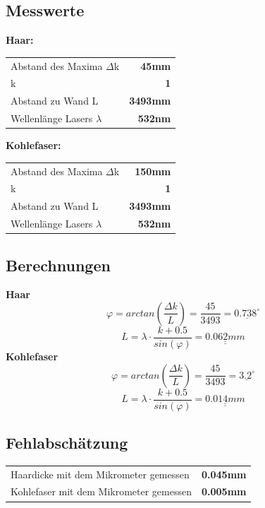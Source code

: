 \documentclass{article}
\begin{document}
\subsection{Messwerte}

\textbf{Haar:}

\begin{tabular}{l r}
	Abstand des Maxima $\Delta$k & \textbf{45mm}\\
	k	&\textbf{1}\\
	Abstand zu Wand L&\textbf{3493mm} \\
	Wellenlänge Lasers $\lambda$ & \textbf{532nm}
\end{tabular}

\textbf{Kohlefaser:}

\begin{tabular}{l r}
	Abstand des Maxima $\Delta$k & \textbf{150mm}\\
	k	&\textbf{1}\\
	Abstand zu Wand L&\textbf{3493mm}\\
	Wellenlänge Lasers $\lambda$ & \textbf{532nm}
\end{tabular}

\subsection{Berechnungen}
\textbf{Haar}
\begin{equation}
\varphi = arctan(\frac{\Delta k}{L}) = \frac{45}{3493}= \underline{0.738^\circ}
\end{equation}
\begin{equation}
L = \lambda \cdot \frac{k+0.5}{sin(\varphi)}=  \underline{\underline{0.062mm}} 
\end{equation}
\textbf{Kohlefaser}
\begin{equation}
\varphi = arctan(\frac{\Delta k}{L}) = \frac{45}{3493}=\underline{3.2^\circ}
\end{equation}
\begin{equation}
L = \lambda \cdot \frac{k+0.5}{sin(\varphi)}= \underline{\underline{0.014mm}} 
\end{equation}
\subsection{Fehlabschätzung}
\begin{tabular}{l r}
	Haardicke mit dem Mikrometer gemessen & \textbf{0.045mm}\\
	Kohlefaser mit dem Mikrometer gemessen	&\textbf{0.005mm}\\
\end{tabular}
\vspace{3mm}
\end{document}
